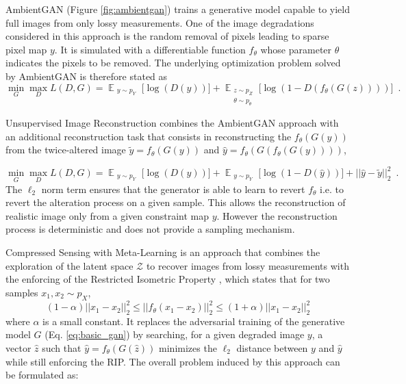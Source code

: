 AmbientGAN \citep{Bora2018} (Figure \ref{fig:ambientgan}) trains a generative model capable to yield full images from only lossy measurements. One of the image degradations considered in this approach is the random removal of pixels leading to sparse pixel map $y$. It is simulated with a differentiable function $f_\theta$ whose parameter $\theta$ indicates the pixels to be removed. The underlying optimization problem solved by AmbientGAN is therefore stated as
\begin{equation}
\min_G \max_D L(D, G) = \mathop{\mathbb{E}}_{\substack{y\sim p_Y}} \Big[\log(D(y))\Big] + \mathop{\mathbb{E}}_{\substack{z\sim p_Z \\\theta \sim p_\theta}} \Big[ \log(1-D(f_\theta(G(z))))\Big] \enspace.
\end{equation}

Unsupervised Image Reconstruction \citep{Pajot2019} combines the AmbientGAN approach with an additional reconstruction task that consists in reconstructing the $f_\theta(G(y))$ from the twice-altered image $\tilde{y} = f_\theta(G(y))$ and $\hat{y} = f_\theta(G(f_\theta(G(y))))$,

\begin{equation}
\min_G \max_D L(D, G) = \mathop{\mathbb{E}}_{\substack{y\sim p_Y}} \Big[\log(D(y))\Big] + \mathop{\mathbb{E}}_{\substack{y\sim p_Y}} \Big[ \log(1-D(\hat{y}))\Big] + ||\hat{y} - \tilde{y} ||^2_2 \enspace.
\end{equation}
\noindent
The $\ell_2$ norm term ensures that the generator is able to learn to revert $f_\theta$ i.e. to revert the alteration process on a given sample. This  allows the reconstruction of realistic image only from a given constraint map $y$. However the reconstruction process is deterministic and does not provide a sampling mechanism.

Compressed Sensing with Meta-Learning \citep{Wu2019} is an approach that combines the exploration of the latent space $\mathcal{Z}$ to recover images from lossy measurements with the enforcing of the Restricted Isometric Property \citep{Candes2005}, which states that for two samples $x_1,x_2 \sim p_X$, $$(1 - \alpha)||x_1 - x_2||_2^2 \leq ||f_\theta(x_1 - x_2)||_2^2 \leq (1 + \alpha) ||x_1 - x_2||_2^2$$ where $\alpha$ is a small constant.
It replaces the adversarial training of the generative model $G$ (Eq. \ref{eq:basic_gan}) by searching, for a given degraded image $y$, a vector $\hat{z}$ such that $\hat{y} = f_\theta(G(\hat{z}))$ minimizes the $\ell_2$ distance between $y$ and $\hat{y}$ while still enforcing the RIP. The overall problem induced by this approach can be formulated as:

